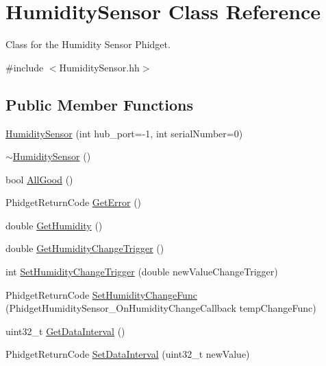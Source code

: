 \hypertarget{classHumiditySensor}{}\section{Humidity\+Sensor Class Reference}
\label{classHumiditySensor}


Class for the Humidity Sensor Phidget.  




{\ttfamily \#include $<$Humidity\+Sensor.\+hh$>$}

\subsection*{Public Member Functions}
\begin{DoxyCompactItemize}
\item 
\hyperlink{classHumiditySensor_a5e199091caca19235543cd9e55493566}{Humidity\+Sensor} (int hub\+\_\+port=-\/1, int serial\+Number=0)
\item 
\hyperlink{classHumiditySensor_a7c176f946d95e90b4f9aabbdbbd90874}{$\sim$\+Humidity\+Sensor} ()
\item 
bool \hyperlink{classHumiditySensor_a5ac9e8fc8d6fc1e78463ce8a7ceae54e}{All\+Good} ()
\item 
Phidget\+Return\+Code \hyperlink{classHumiditySensor_aa425c22d068e39da7df26f473499dd37}{Get\+Error} ()
\item 
double \hyperlink{classHumiditySensor_aea4b9c30bd7fd630b98b80eea609030e}{Get\+Humidity} ()
\item 
double \hyperlink{classHumiditySensor_a9bf5c13ab0c29b42fe7bc2fc0edde7ee}{Get\+Humidity\+Change\+Trigger} ()
\item 
int \hyperlink{classHumiditySensor_aedd8316be052bfbda8b882b61ad46a0b}{Set\+Humidity\+Change\+Trigger} (double new\+Value\+Change\+Trigger)
\item 
Phidget\+Return\+Code \hyperlink{classHumiditySensor_a8ceff441668925dab38fecb150879160}{Set\+Humidity\+Change\+Func} (Phidget\+Humidity\+Sensor\+\_\+\+On\+Humidity\+Change\+Callback temp\+Change\+Func)
\item 
uint32\+\_\+t \hyperlink{classHumiditySensor_a19dce556c56c771849e4f62398a4bb1f}{Get\+Data\+Interval} ()
\item 
Phidget\+Return\+Code \hyperlink{classHumiditySensor_a7e8cd7d20eb2c942ca6fc7c22abd6fb8}{Set\+Data\+Interval} (uint32\+\_\+t new\+Value)
\end{DoxyCompactItemize}


